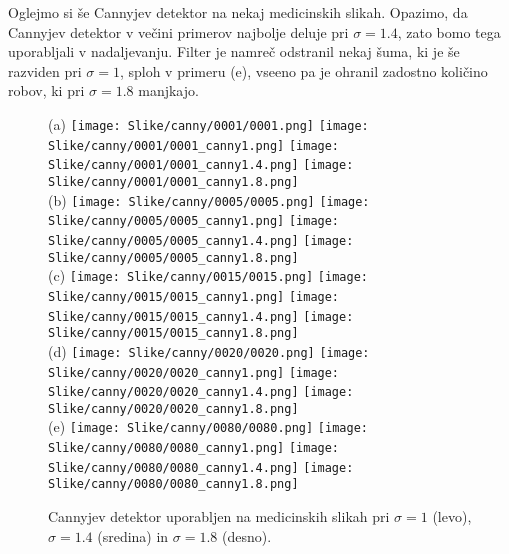 \documentclass{article}
\begin{document}
    Oglejmo si še Cannyjev detektor na nekaj medicinskih slikah. Opazimo, da Cannyjev detektor v večini primerov najbolje deluje pri $\sigma = 1.4$,
    zato bomo tega uporabljali v nadaljevanju. Filter je namreč odstranil nekaj šuma, ki je še razviden pri $\sigma = 1$, sploh v primeru (e), 
    vseeno pa je ohranil zadostno količino robov, ki pri $\sigma = 1.8$ manjkajo.
    \begin{figure}[H]
        \centering
        (a)
        \texttt{[image: Slike/canny/0001/0001.png]} 
        \texttt{[image: Slike/canny/0001/0001\_canny1.png]}
        \texttt{[image: Slike/canny/0001/0001\_canny1.4.png]} 
        \texttt{[image: Slike/canny/0001/0001\_canny1.8.png]} \\
        (b)
        \texttt{[image: Slike/canny/0005/0005.png]} 
        \texttt{[image: Slike/canny/0005/0005\_canny1.png]}
        \texttt{[image: Slike/canny/0005/0005\_canny1.4.png]} 
        \texttt{[image: Slike/canny/0005/0005\_canny1.8.png]}\\
        (c)
        \texttt{[image: Slike/canny/0015/0015.png]} 
        \texttt{[image: Slike/canny/0015/0015\_canny1.png]}
        \texttt{[image: Slike/canny/0015/0015\_canny1.4.png]} 
        \texttt{[image: Slike/canny/0015/0015\_canny1.8.png]}\\
        (d)
        \texttt{[image: Slike/canny/0020/0020.png]} 
        \texttt{[image: Slike/canny/0020/0020\_canny1.png]}
        \texttt{[image: Slike/canny/0020/0020\_canny1.4.png]} 
        \texttt{[image: Slike/canny/0020/0020\_canny1.8.png]}\\
        (e)
        \texttt{[image: Slike/canny/0080/0080.png]} 
        \texttt{[image: Slike/canny/0080/0080\_canny1.png]}
        \texttt{[image: Slike/canny/0080/0080\_canny1.4.png]} 
        \texttt{[image: Slike/canny/0080/0080\_canny1.8.png]}
        \caption{Cannyjev detektor uporabljen na medicinskih slikah pri $\sigma = 1$ (levo), $\sigma = 1.4$ (sredina) in $\sigma = 1.8$ (desno).}
        \label{basic}
    \end{figure}

    
\end{document}
